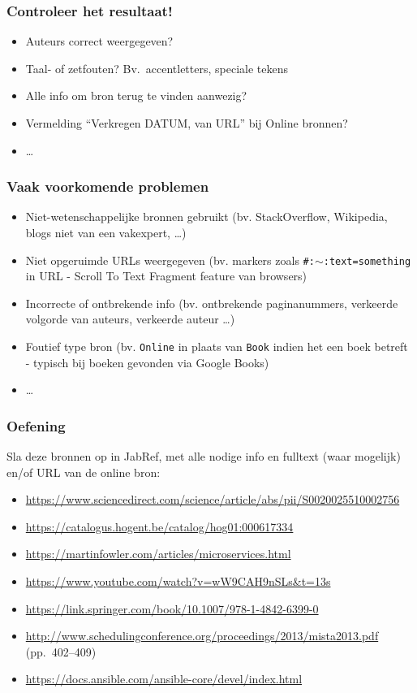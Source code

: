 \documentclass[aspectratio=169]{beamer}
\begin{document}
\begin{frame}
  \frametitle{Controleer het resultaat!}

  \begin{itemize}
    \item Auteurs correct weergegeven?
    \item Taal- of zetfouten? Bv.\ accentletters, speciale tekens
    \item Alle info om bron terug te vinden aanwezig?
    \item Vermelding ``Verkregen DATUM, van URL'' bij Online bronnen?
    \item \ldots
  \end{itemize}

\end{frame}

\begin{frame}
  \frametitle{Vaak voorkomende problemen}

  \begin{itemize}
    \item Niet-wetenschappelijke bronnen gebruikt (bv. StackOverflow, Wikipedia, blogs niet van een vakexpert, \ldots)
    \item Niet opgeruimde URLs weergegeven (bv. markers zoals \texttt{\#:$\sim$:text=something} in URL - Scroll To Text Fragment feature van browsers)
    \item Incorrecte of ontbrekende info (bv. ontbrekende paginanummers, verkeerde volgorde van auteurs, verkeerde auteur \ldots)
    \item Foutief type bron (bv. \texttt{Online} in plaats van \texttt{Book} indien het een boek betreft - typisch bij boeken gevonden via Google Books)
    \item \ldots
  \end{itemize}
\end{frame}

\begin{frame}[plain]
  \frametitle{Oefening}

  Sla deze bronnen op in JabRef, met alle nodige info en fulltext (waar mogelijk) en/of URL van de online bron:

  \bigskip

  \begin{itemize}
    \item \url{https://www.sciencedirect.com/science/article/abs/pii/S0020025510002756}
    \item \url{https://catalogus.hogent.be/catalog/hog01:000617334}
    \item \url{https://martinfowler.com/articles/microservices.html}
    \item \url{https://www.youtube.com/watch?v=wW9CAH9nSLs&t=13s}
    \item \url{https://link.springer.com/book/10.1007/978-1-4842-6399-0}
    \item \url{http://www.schedulingconference.org/proceedings/2013/mista2013.pdf} (pp.\ 402--409)
    \item \url{https://docs.ansible.com/ansible-core/devel/index.html}
  \end{itemize}

\end{frame}
\end{document}
